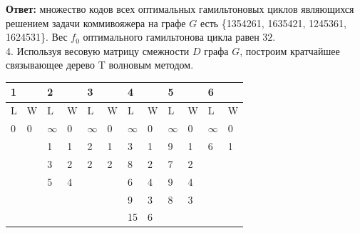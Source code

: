 \documentclass[12pt]{article}
\begin{document}
	\noindent
	\textbf{Ответ:} множество кодов всех оптимальных гамильтоновых 
	циклов являющихся решением задачи коммивояжера на графе $G$ есть 
	\{1354261, 1635421, 1245361, 1624531\}.
	Вес $f_0$ оптимального гамильтонова цикла равен $32$. \\
	
	4. Используя весовую матрицу смежности $D$ графа $G$,
	построим кратчайшее связывающее дерево T волновым методом. \\


\begin{table}[!h]
\begin{tabular}{|l|l|l|l|l|l|l|l|l|l|l|l|}
\hline
\multicolumn{2}{|l|}{1}                 & \multicolumn{2}{l|}{2}                 & \multicolumn{2}{l|}{3}                 & \multicolumn{2}{l|}{4}                 & \multicolumn{2}{l|}{5} & \multicolumn{2}{l|}{6} \\ \hline
L                  & W                  & L                  & W                 & L                  & W                 & L                  & W                 & L          & W         & L          & W         \\ \hline
0                  & 0                  & $\infty$                  & 0                 & $\infty$                  & 0                 & $\infty$                  & 0                 & $\infty$          & 0         & $\infty$          & 0         \\ \hline
\multicolumn{2}{|l|}{\multirow{5}{*}{}} & 1                  & 1                 & 2                  & 1                 & 3                  & 1                 & 9          & 1         & 6          & 1         \\ \cline{3-12} 
\multicolumn{2}{|l|}{}                  & \multicolumn{2}{l|}{\multirow{4}{*}{}} & 3                  & 2                 & 2                  & 2                 & 8          & 2         & 7          & 2         \\ \cline{5-12} 
\multicolumn{2}{|l|}{}                  & \multicolumn{2}{l|}{}                  & 5                  & 4                 & \multicolumn{2}{l|}{\multirow{3}{*}{}} & 6          & 4         & 9          & 4         \\ \cline{5-6} \cline{9-12} 
\multicolumn{2}{|l|}{}                  & \multicolumn{2}{l|}{}                  & \multicolumn{2}{l|}{\multirow{2}{*}{}} & \multicolumn{2}{l|}{}                  & 9          & 3         & 8          & 3         \\ \cline{9-12} 
\multicolumn{2}{|l|}{}                  & \multicolumn{2}{l|}{}                  & \multicolumn{2}{l|}{}                  & \multicolumn{2}{l|}{}                  & 15         & 6         & \multicolumn{2}{l|}{}  \\ \hline
\end{tabular}
\end{table}
\end{document}
